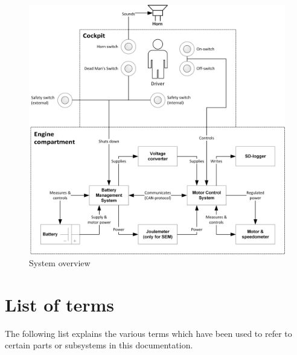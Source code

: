\begin{figure}[H]
	\centering
	\includegraphics[width=1\linewidth]{Introduction/Overview}
	\caption{System overview}
	\label{fig:System_overview}
\end{figure}

\newpage
\section{List of terms}
The following list explains the various terms which have been used to refer to certain parts or subsystems in this documentation.

